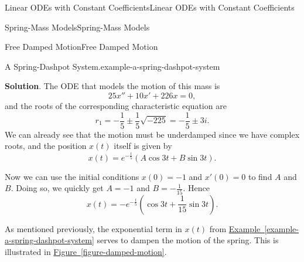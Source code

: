 \documentclass[10pt,]{book}
\numberwithin{equation}{section}
\begin{document}
\begin{chapterptx}{Linear ODEs with Constant Coefficients}{}{Linear ODEs with Constant Coefficients}{}{}
\begin{sectionptx}{Spring-Mass Models}{}{Spring-Mass Models}{}{}
\begin{subsectionptx}{Free Damped Motion}{}{Free Damped Motion}{}{}
\begin{example}{A Spring-Dashpot System.}{example-a-spring-dashpot-system}
\par\smallskip%
\noindent\textbf{Solution}.\hypertarget{solution-31}{}\quad%
\hypertarget{p-219}{}%
The ODE that models the motion of this mass is%
\begin{equation*}
25x'' + 10x' + 226x = 0,
\end{equation*}
and the roots of the corresponding characteristic equation are%
\begin{equation*}
r_{1} = -\frac{1}{5} \pm \frac{1}{5}\sqrt{-225} = -\frac{1}{5}\pm3i.
\end{equation*}
We can already see that the motion must be underdamped since we have complex roots, and the position \(x(t)\) itself is given by%
\begin{equation*}
x(t) = e^{-\frac{t}{5}}(A\cos3t + B\sin3t).
\end{equation*}
%
\par
\hypertarget{p-220}{}%
Now we can use the initial conditions \(x(0) = -1\) and \(x'(0) = 0\) to find \(A\) and \(B\). Doing so, we quickly get \(A = -1\) and \(B = -\frac{1}{15}\). Hence%
\begin{equation*}
x(t) = -e^{-\frac{t}{5}}\left(\cos3t + \frac{1}{15}\sin3t\right).
\end{equation*}
%
\end{example}
\hypertarget{p-221}{}%
As mentioned previously, the exponential term in \(x(t)\) from \hyperref[example-a-spring-dashpot-system]{Example~\ref{example-a-spring-dashpot-system}} serves to dampen the motion of the spring. This is illustrated in \hyperref[figure-damped-motion]{Figure~\ref{figure-damped-motion}}.%
\begin{figure}
\centering
{
}
\end{figure}
\end{subsectionptx}
\end{sectionptx}
\end{chapterptx}
\end{document}
